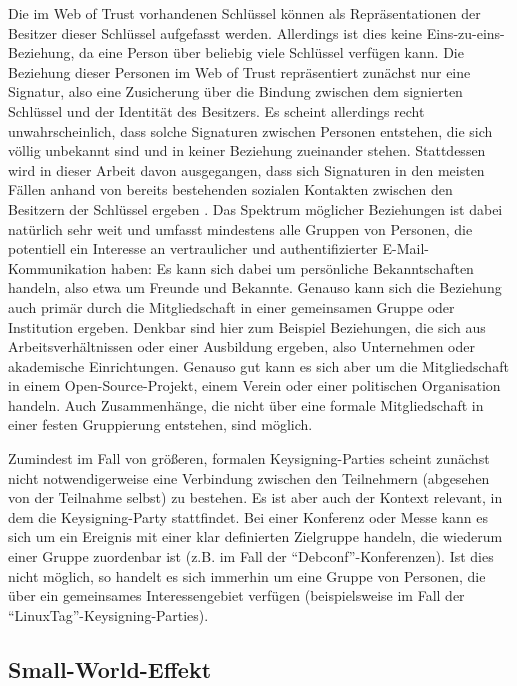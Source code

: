 Die im Web of Trust vorhandenen Schlüssel können als
Repräsentationen der Besitzer dieser Schlüssel aufgefasst
werden. Allerdings ist dies keine Eins-zu-eins-Beziehung, da eine
Person über beliebig viele Schlüssel verfügen kann. Die
Beziehung dieser Personen im Web of Trust repräsentiert zunächst
nur eine Signatur, also eine Zusicherung über die Bindung zwischen
dem signierten Schlüssel und der Identität des Besitzers. Es
scheint allerdings recht unwahrscheinlich, dass solche Signaturen
zwischen Personen entstehen, die sich völlig unbekannt sind und in
keiner Beziehung zueinander stehen. Stattdessen wird in dieser Arbeit
davon ausgegangen, dass sich Signaturen in den meisten Fällen anhand
von bereits bestehenden sozialen Kontakten zwischen den Besitzern der
Schlüssel ergeben \cite{Capkun2002}. Das Spektrum möglicher
Beziehungen ist dabei natürlich sehr weit und umfasst mindestens
alle Gruppen von Personen, die potentiell ein Interesse an
vertraulicher und authentifizierter E-Mail-Kommunikation haben: Es
kann sich dabei um persönliche Bekanntschaften handeln, also etwa um
Freunde und Bekannte. Genauso kann sich die Beziehung auch primär
durch die Mitgliedschaft in einer gemeinsamen Gruppe oder Institution
ergeben. Denkbar sind hier zum Beispiel Beziehungen, die sich aus
Arbeitsverhältnissen oder einer Ausbildung ergeben, also Unternehmen
oder akademische Einrichtungen. Genauso gut kann es sich aber um die
Mitgliedschaft in einem Open-Source-Projekt, einem Verein oder einer
politischen Organisation handeln. Auch Zusammenhänge, die nicht
über eine formale Mitgliedschaft in einer festen Gruppierung
entstehen, sind möglich.

Zumindest im Fall von größeren, formalen Keysigning-Parties scheint
zunächst nicht notwendigerweise eine Verbindung zwischen den
Teilnehmern (abgesehen von der Teilnahme selbst) zu bestehen. Es ist
aber auch der Kontext relevant, in dem die Keysigning-Party
stattfindet. Bei einer Konferenz oder Messe kann es sich um ein
Ereignis mit einer klar definierten Zielgruppe handeln, die wiederum
einer Gruppe zuordenbar ist (z.B. im Fall der
``Debconf''-Konferenzen). Ist dies nicht möglich, so handelt es sich
immerhin um eine Gruppe von Personen, die über ein gemeinsames
Interessengebiet verfügen (beispielsweise im Fall der
``LinuxTag''-Keysigning-Parties).

\subsection{Small-World-Effekt}
\label{sec:small-world-effekt}

